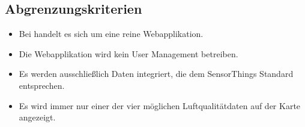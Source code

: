 \subsection{Abgrenzungskriterien}
    \begin{itemize}
	\item Bei \softwarename handelt es sich um eine reine Webapplikation.
	\item Die Webapplikation wird kein User Management betreiben.
	\item Es werden ausschließlich Daten integriert, die dem SensorThings Standard entsprechen.
	\item Es wird immer nur einer der vier möglichen Luftqualitätdaten auf der Karte angezeigt.
\end{itemize}